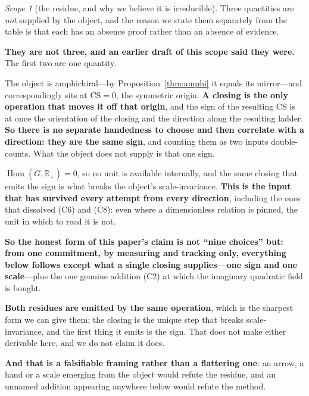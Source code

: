 \documentclass[11pt,reqno]{amsart}
\theoremstyle{plain}
\theoremstyle{definition}
\theoremstyle{remark}
\newtheorem{scope}[theorem]{Scope}
\newcommand{\R}{\mathbb{R}}
\begin{document}
\begin{scope}[the residue, and why we believe it is irreducible]\label{sc:residue}
Three quantities are \emph{not} supplied by the object, and the reason we state them
separately from the table is that each has an absence proof rather than an absence of
evidence.

\textbf{They are not three, and an earlier draft of this scope said they were.} The
first two are one quantity.

\begin{description}[leftmargin=1.9em,style=nextline,itemsep=2pt]
\item[\textnormal{\textbf{One sign, which is simultaneously an arrow and a hand.}}]
  The object is amphichiral---by Proposition~\ref{thm:amphi} it equals its
  mirror---and correspondingly sits at $\mathrm{CS}=0$, the symmetric origin. \textbf{A
  closing is the only operation that moves it off that origin}, and the sign of the
  resulting $\mathrm{CS}$ is at once the orientation of the closing and the direction
  along the resulting ladder. \textbf{So there is no separate handedness to choose and
  then correlate with a direction: they are the same sign}, and counting them as two
  inputs double-counts. What the object does not supply is that one sign.
\item[\textnormal{\textbf{One scale.}}] $\operatorname{Hom}(G,\R_+)=0$, so no unit is
  available internally, and the same closing that emits the sign is what breaks the
  object's scale-invariance. \textbf{This is the input that has survived every attempt
  from every direction}, including the ones that dissolved (C6) and (C8): even where a
  dimensionless relation is pinned, the unit in which to read it is not.
\end{description}

\noindent\textbf{So the honest form of this paper's claim is not ``nine choices'' but:
from one commitment, by measuring and tracking only, everything below follows except
what a single closing supplies---one sign and one scale}---plus the one genuine addition
(C2) at which the imaginary quadratic field is bought.

\textbf{Both residues are emitted by the same operation}, which is the sharpest form we
can give them: the closing is the unique step that breaks scale-invariance, and the
first thing it emits is the sign. That does not make either derivable here, and we do
not claim it does.

\textbf{And that is a falsifiable framing rather than a flattering one}: an arrow, a hand
or a scale emerging from the object would refute the residue, and an unnamed addition
appearing anywhere below would refute the method.
\end{scope}
\end{document}

